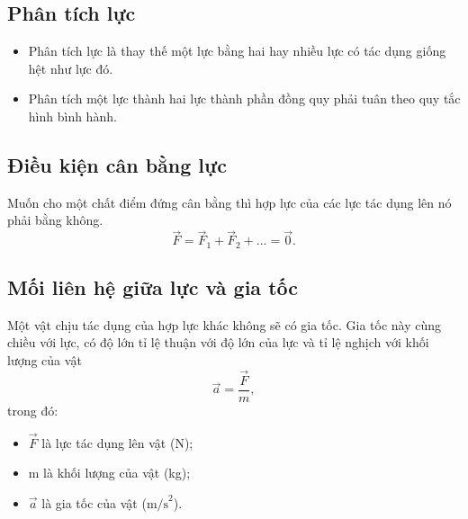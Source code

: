 \subsection{Phân tích lực}
\begin{itemize}
	\item Phân tích lực là thay thế một lực bằng hai hay nhiều lực có tác dụng giống hệt như lực đó.
	\item Phân tích một lực thành hai lực thành phần đồng quy phải tuân theo quy tắc hình bình hành.
\end{itemize}
\subsection{Điều kiện cân bằng lực}
Muốn cho một chất điểm đứng cân bằng thì hợp lực của các lực tác dụng lên nó phải bằng không.
$$\vec{F}=\vec{F}_1+\vec{F}_2+...=\vec{0}.$$
\subsection{Mối liên hệ giữa lực và gia tốc}
Một vật chịu tác dụng của hợp lực khác không sẽ có gia tốc. Gia tốc này cùng chiều với lực, có độ lớn tỉ lệ thuận với độ lớn của lực và tỉ lệ nghịch với khối lượng của vật
\begin{equation*}
	\vec{a}=\dfrac{\vec F}{m},
\end{equation*}
trong đó:
\begin{itemize}
	\item $\vec F$ là lực tác dụng lên vật (N);
	\item m là khối lượng của vật (kg);
	\item $\vec a$ là gia tốc của vật ($\text{m/s}^2$).
\end{itemize}
